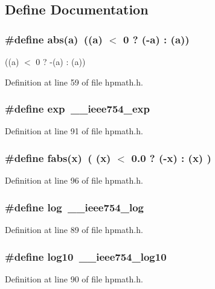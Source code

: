 \subsection{Define Documentation}
\subsubsection{\setlength{\rightskip}{0pt plus 5cm}\#define abs(a)\ ((a) $<$ 0 ? (-a) : (a))}\label{hpmath_8h_a2}


((a) $<$ 0 ? -(a) : (a)) 

Definition at line 59 of file hpmath.h.
\subsubsection{\setlength{\rightskip}{0pt plus 5cm}\#define exp\ \_\-\_\-ieee754\_\-exp}\label{hpmath_8h_a5}




Definition at line 91 of file hpmath.h.
\subsubsection{\setlength{\rightskip}{0pt plus 5cm}\#define fabs(x)\ ( (x) $<$ 0.0 ? (-x) : (x) )}\label{hpmath_8h_a9}




Definition at line 96 of file hpmath.h.
\subsubsection{\setlength{\rightskip}{0pt plus 5cm}\#define log\ \_\-\_\-ieee754\_\-log}\label{hpmath_8h_a3}




Definition at line 89 of file hpmath.h.
\subsubsection{\setlength{\rightskip}{0pt plus 5cm}\#define log10\ \_\-\_\-ieee754\_\-log10}\label{hpmath_8h_a4}




Definition at line 90 of file hpmath.h.
